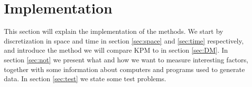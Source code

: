 \chapter{Implementation}%
\label{sec:imp}
This section will explain the implementation of the methods. We start by discretization in space and time in section \ref{sec:space} and \ref{sec:time} respectively, and introduce the method we will compare KPM to in section \ref{sec:DM}. 
In section \ref{sec:not} we present what and how we want to measure interesting factors, together with some information about computers and programs used to generate data.
In section \ref{sec:test} we state some test problems.

